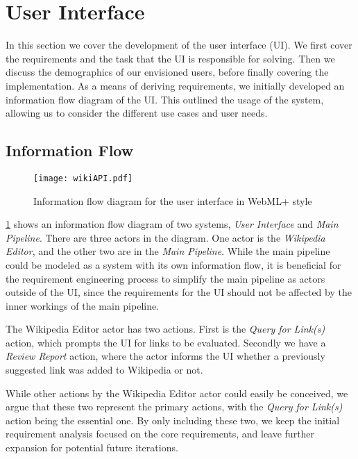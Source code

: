 \section{User Interface}\label{sec:design_ui}

In this section we cover the development of the user interface (UI). We first cover the requirements and the task that the UI is responsible for solving. Then we discuss the demographics of our envisioned users, before finally covering the implementation. As a means of deriving requirements, we initially developed an information flow diagram of the UI\@. This outlined the usage of the system, allowing us to consider the different use cases and user needs.

\subsection{Information Flow}

\begin{figure}[tbp]
\centering
\texttt{[image: wikiAPI.pdf]}
\caption[Information flow diagram for the user interface]{Information flow diagram for the user interface in WebML+ style~\cite{Casteleyn2009}}
\label{fig:information_flow_UI}
\end{figure}

\cref{fig:information_flow_UI} shows an information flow diagram of two systems, \emph{User Interface} and \emph{Main Pipeline}. There are three actors in the diagram. One actor is the \emph{Wikipedia Editor}, and the other two are in the \emph{Main Pipeline}. While the main pipeline could be modeled as a system with its own information flow, it is beneficial for the requirement engineering process to simplify the main pipeline as actors outside of the UI, since the requirements for the UI should not be affected by the inner workings of the main pipeline.

The Wikipedia Editor actor has two actions. First is the \emph{Query for Link(s)} action, which prompts the UI for links to be evaluated. Secondly we have a \emph{Review Report} action, where the actor informs the UI whether a previously suggested link was added to Wikipedia or not.

While other actions by the Wikipedia Editor actor could easily be conceived, we argue that these two represent the primary actions, with the \emph{Query for Link(s)} action being the essential one. By only including these two, we keep the initial requirement analysis focused on the core requirements, and leave further expansion for potential future iterations.

